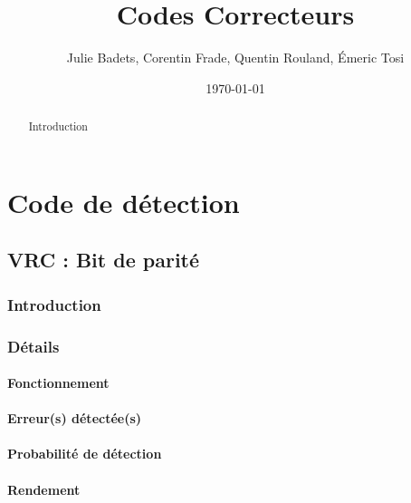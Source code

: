 \documentclass[a4paper,10pt]{report}
\title{Codes Correcteurs}
\author{Julie Badets, Corentin Frade, Quentin Rouland, Émeric Tosi}
\date{\today}
\begin{document}
    \maketitle{}


    \begin{abstract}
        Introduction
    \end{abstract}


    \tableofcontents{}


    \part{Code de détection}
        \chapter{VRC : Bit de parité}
            \section{Introduction}
            \section{Détails}
                \subsection{Fonctionnement}
                \subsection{Erreur(s) détectée(s)}
                \subsection{Probabilité de détection}
                \subsection{Rendement}
\end{document}
